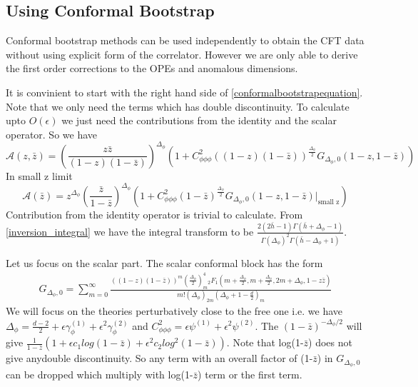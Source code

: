 \documentclass[12pt,a4paper,oneside]{book}
\theoremstyle{definition}
\begin{document}
        \subsection{Using Conformal Bootstrap}
            Conformal bootstrap methods can be used independently to obtain the CFT data without using explicit form of the correlator. However we are only able to derive the first order corrections to the OPEs and anomalous dimensions. \par
             It is convinient to start with the right hand side of \ref{conformalbootstrapequation}. Note that we only need the terms which has double discontinuity. To calculate upto $O(\epsilon)$ we just need the contributions from the identity and the scalar operator. So we have 
        \begin{equation}
            \mathcal{A}(z,\bar{z}) = \left(\frac{z\bar{z}}{(1-z)(1-\bar{z})}\right)^{\Delta_{\phi}}\left(1+C_{\phi\phi\phi}^{2}((1-z)(1-\bar{z}))^{\frac{\Delta_{\phi}}{2}}G_{\Delta_{\phi},0}(1-z,1-\bar{z}) \right)
        \end{equation} 
        In small z limit 
        \begin{equation}
            \mathcal{A}(\bar{z}) = z^{\Delta_{\phi}}\left(\frac{\bar{z}}{1-\bar{z}}\right)^{\Delta_{\phi}}\left(1+C_{\phi\phi\phi}^{2}(1-\bar{z})^{\frac{\Delta_{\phi}}{2}}G_{\Delta_{\phi},0}(1-z,1-\bar{z})\rvert_{\text{small z}} \right)           
        \end{equation}  
        Contribution from the identity operator is trivial to calculate. From \ref{inversion_integral} we have the integral transform to be $\frac{2(2\bar{h}-1)\Gamma(\bar{h}+\Delta_{\phi}-1)}{\Gamma(\Delta_{\phi})^2\Gamma(\bar{h}-\Delta_{\phi}+1)}$.\par
        Let us focus on the scalar part. The scalar conformal block has the form
        \begin{align}
            G_{\Delta_{\phi},0} = \sum_{m=0}^{\infty}\frac{((1-z)(1-\bar{z}))^m\left(\frac{\Delta_{\phi}}{2}\right)_m^4{}_2F_1(m+\frac{\Delta_{\phi}}{2},m+\frac{\Delta_{\phi}}{2},2m+\Delta_{\phi},1-z\bar{z})}{m!(\Delta_{\phi})_{2m}\left(\Delta_{\phi}+1-\frac{d}{2}\right)_m}
        \end{align} 
        We will focus on the theories perturbatively close to the free one i.e. we have $\Delta_{\phi} = \frac{d-2}{2}+\epsilon\gamma_{\phi}^{(1)}+\epsilon^2\gamma_{\phi}^{(2)} $ and $C_{\phi\phi\phi}^2  = \epsilon\psi^{(1)}+\epsilon^2\psi^{(2)} $. The $(1-\bar{z})^{-\Delta_{\phi}/2}$ will give $\frac{1}{1-\bar{z}}(1+\epsilon c_1log(1-\bar{z})+\epsilon^2c_2log^2(1-\bar{z}))$. Note that log(1-$\bar{z}$) does not give anydouble discontinuity. So any term with an overall factor of (1-$\bar{z}$) in $G_{\Delta_{\phi},0}$ can be dropped which multiply with log(1-$\bar{z}$) term or the first term. \par
\end{document}
